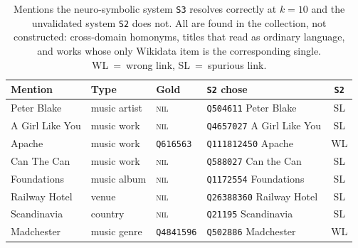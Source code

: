 \begin{table}[t]
\centering
\small
\caption{Mentions the neuro-symbolic system \texttt{S3} resolves correctly at $k=10$ and the unvalidated system \texttt{S2} does not. All are found in the collection, not constructed: cross-domain homonyms, titles that read as ordinary language, and works whose only Wikidata item is the corresponding single. WL~=~wrong link, SL~=~spurious link.}
\label{tab:el-hard}
\begin{tabular}{llllc}
\toprule
Mention & Type & Gold & \texttt{S2} chose & \texttt{S2} \\
\midrule
Peter Blake & music artist & \textsc{nil} & \texttt{Q504611} Peter Blake & SL \\
A Girl Like You & music work & \textsc{nil} & \texttt{Q4657027} A Girl Like You & SL \\
Apache & music work & \texttt{Q616563} & \texttt{Q111812450} Apache & WL \\
Can The Can & music work & \textsc{nil} & \texttt{Q588027} Can the Can & SL \\
Foundations & music album & \textsc{nil} & \texttt{Q1172554} Foundations & SL \\
Railway Hotel & venue & \textsc{nil} & \texttt{Q26388360} Railway Hotel & SL \\
Scandinavia & country & \textsc{nil} & \texttt{Q21195} Scandinavia & SL \\
Madchester & music genre & \texttt{Q4841596} & \texttt{Q502886} Madchester & WL \\
\bottomrule
\end{tabular}
\end{table}

